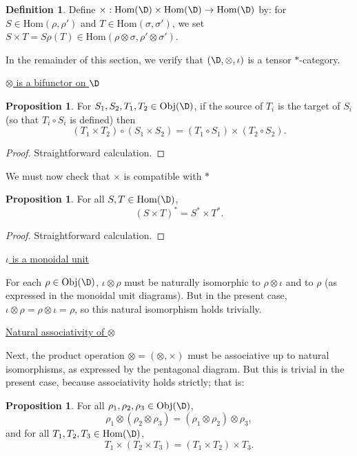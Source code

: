 \documentclass[11pt]{article}
\theoremstyle{definition}
\newtheorem{prop}[thm]{Proposition}
\theoremstyle{definition}
\newtheorem{defn}[thm]{Definition}
\theoremstyle{remark}
\newcommand{\Obj}{\mathrm{Obj}}
\newcommand{\Hom}{\mathrm{Hom}}
\begin{document}
\begin{defn} Define $\times :\Hom (\D )\times \Hom (\D )\to \Hom (\D )$ by: for $S\in
  \Hom (\rho ,\rho ')$ and $T\in \Hom (\sigma ,\sigma ')$, we set $S\times T=S\rho
  (T)\in \Hom (\rho \otimes \sigma ,\rho '\otimes \sigma ')$. \end{defn}

In the remainder of this section, we verify that $(\D,
\otimes ,\iota )$ is a tensor $*$-category.

\bigskip \noindent \underline{$\otimes$ is a bifunctor on $\D$} 

\smallskip \begin{prop} For $S_1,S_2,T_1,T_2\in \Obj (\D )$, if the source of $T_i$ is the
  target of $S_i$ (so that $T_i\circ S_i$ is defined) then
$$ (T_1\times T_2)\circ (S_1\times S_2) = (T_1\circ S_1)\times (T_2\circ S_2) .$$
\end{prop}

\begin{proof} Straightforward calculation.  \end{proof}

We must now check that $\times$ is compatible with $*$

\begin{prop} For all $S,T\in \Hom (\D )$,
$$ (S\times T)^*=S^*\times T^*. $$ \end{prop}

\begin{proof} Straightforward calculation.
\end{proof}

\bigskip \noindent \underline{$\iota$ is a monoidal unit}

\smallskip For each $\rho \in \Obj (\D )$, $\iota \otimes \rho$ must be naturally isomorphic to
$\rho \otimes \iota$ and to $\rho$ (as expressed in the monoidal unit diagrams).  But
in the present case, $\iota \otimes \rho =\rho \otimes \iota =\rho$, so this natural
isomorphism holds trivially.


\bigskip \noindent \underline{Natural associativity of $\otimes$}

\smallskip Next, the product operation $\otimes =(\otimes ,\times )$ must be associative up to
natural isomorphisms, as expressed by the pentagonal diagram.  But this is trivial in
the present case, because associativity holds strictly; that is:

  \begin{prop} For all $\rho _1,\rho _2,\rho _3\in \Obj (\D )$, $$\rho _1\otimes
    (\rho _2\otimes \rho _3)=(\rho _1\otimes \rho _2)\otimes \rho _3 ,$$ and for all
    $T_1,T_2,T_3\in \Hom (\D)$, $$ T_1\times (T_2\times T_3)=(T_1\times T_2)\times
    T_3.  $$ \end{prop}
\end{document}
